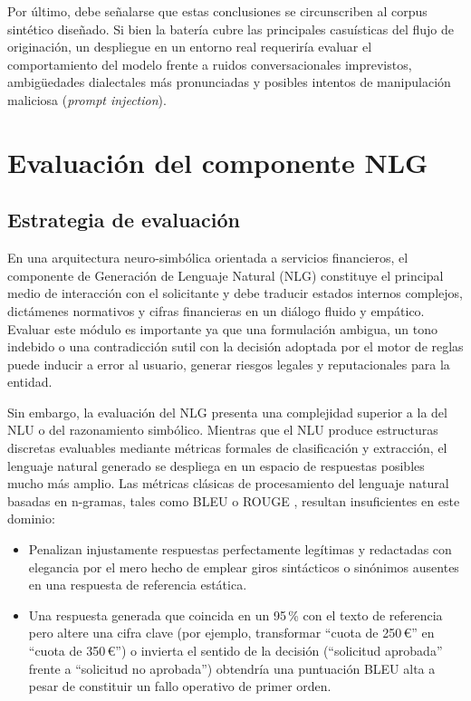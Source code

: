 \documentclass[12pt,a4paper]{report}
\begin{document}
Por último, debe señalarse que estas conclusiones se circunscriben al corpus sintético diseñado. Si bien la batería cubre las principales casuísticas del flujo de originación, un despliegue en un entorno real requeriría evaluar el comportamiento del modelo frente a ruidos conversacionales imprevistos, ambigüedades dialectales más pronunciadas y posibles intentos de manipulación maliciosa (\textit{prompt injection}).


\section{Evaluación del componente NLG}

\subsection{Estrategia de evaluación}

En una arquitectura neuro-simbólica orientada a servicios financieros, el componente de Generación de Lenguaje Natural (NLG) constituye el principal medio de interacción con el solicitante y debe traducir estados internos complejos, dictámenes normativos y cifras financieras en un diálogo fluido y empático. Evaluar este módulo es importante ya que una formulación ambigua, un tono indebido o una contradicción sutil con la decisión adoptada por el motor de reglas puede inducir a error al usuario, generar riesgos legales y reputacionales para la entidad.

Sin embargo, la evaluación del NLG presenta una complejidad superior a la del NLU o del razonamiento simbólico. Mientras que el NLU produce estructuras discretas evaluables mediante métricas formales de clasificación y extracción, el lenguaje natural generado se despliega en un espacio de respuestas posibles mucho más amplio. Las métricas clásicas de procesamiento del lenguaje natural basadas en n-gramas, tales como BLEU \cite{papineni2002bleu} o ROUGE \cite{lin2004rouge}, resultan insuficientes en este dominio:
\begin{itemize}
    \item Penalizan injustamente respuestas perfectamente legítimas y redactadas con elegancia por el mero hecho de emplear giros sintácticos o sinónimos ausentes en una respuesta de referencia estática.
    \item Una respuesta generada que coincida en un 95\,\% con el texto de referencia pero altere una cifra clave (por ejemplo, transformar ``cuota de 250\,€'' en ``cuota de 350\,€'') o invierta el sentido de la decisión (``solicitud aprobada'' frente a ``solicitud no aprobada'') obtendría una puntuación BLEU alta a pesar de constituir un fallo operativo de primer orden.
\end{itemize}
\end{document}
